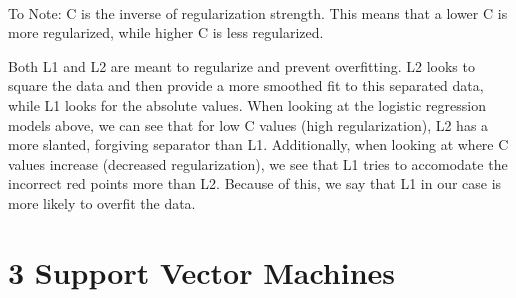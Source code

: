 \documentclass[11pt]{article}
\begin{document}
    \begin{center}
    \end{center}
    { \hspace*{\fill} \\}
    
    To Note: C is the inverse of regularization strength. This means that a
lower C is more regularized, while higher C is less regularized.

Both L1 and L2 are meant to regularize and prevent overfitting. L2 looks
to square the data and then provide a more smoothed fit to this
separated data, while L1 looks for the absolute values. When looking at
the logistic regression models above, we can see that for low C values
(high regularization), L2 has a more slanted, forgiving separator than
L1. Additionally, when looking at where C values increase (decreased
regularization), we see that L1 tries to accomodate the incorrect red
points more than L2. Because of this, we say that L1 in our case is more
likely to overfit the data.

    \section{3 Support Vector Machines}\label{support-vector-machines}
\end{document}
